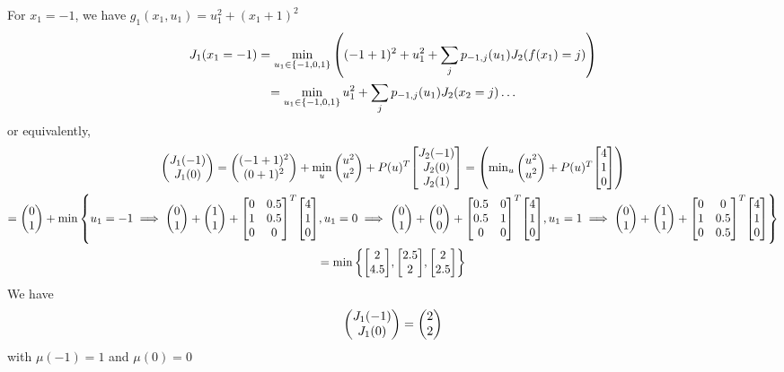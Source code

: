 \documentclass[]{article}
\begin{document}
For $x_1 = -1$, we have $g_1(x_1,u_1) = u_1^2 + (x_1+1)^2$
\begin{multline}
    J_1(x_1=-1) = \min_{u_1 \in \{-1,0,1\}} \qty(
        (-1+1)^2 + u_1^2 + \sum_{j} p_{-1, j}(u_1) J_2(f(x_1)=j)
    ) \\
    = \min_{u_1 \in \{-1,0,1\}} u_1^2 + \sum_{j} p_{-1, j}(u_1) J_2(x_2=j)
    \dots
\end{multline}
or equivalently,
\begin{multline}
    \mqty(J_1(-1)\\ J_1(0)) = \mqty((-1+1)^2\\(0+1)^2) +
        \min_{u} \mqty(u^2\\u^2) + P(u)^T \mqty[J_2(-1)\\J_2(0)\\J_2(1)] = \mqty(
        \min_{u} \mqty(u^2\\u^2) + P(u)^T \mqty[4\\1\\0]
    )\\
    = \mqty(0\\1) + \min \qty{
        u_1=-1 \implies \mqty(0\\1) + \mqty(1\\1) + \mqty[
        0 & 0.5\\
        1 & 0.5\\
        0 & 0
    ]^T \mqty[4\\1\\0],
    u_1 = 0 \implies \mqty(0\\1) + \mqty(0\\0) +  \mqty[
        0.5 & 0\\
        0.5 & 1\\
        0 & 0
    ]^T \mqty[4\\1\\0],
    u_1 = 1 \implies \mqty(0\\1) + \mqty(1\\1) +  \mqty[
        0 & 0\\
        1 & 0.5\\
        0 & 0.5
    ]^T\mqty[4\\1\\0]
    } \\
    = \min \qty{
        \mqty[2\\4.5],
        \mqty[2.5\\2],
        \mqty[2\\2.5]
    }
\end{multline}
We have \[
    \mqty(J_1(-1)\\ J_1(0)) = \mqty(2\\2)
\] with $\mu(-1) = 1$ and $\mu(0) = 0$
\end{document}

